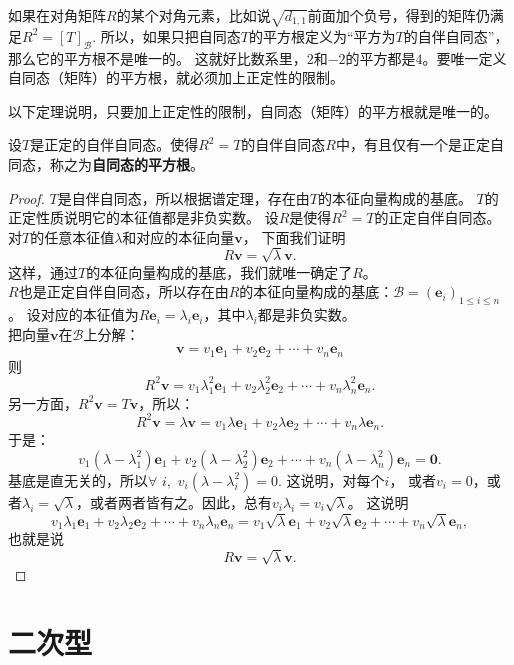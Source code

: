 \documentclass[12pt,UTF8]{ctexbook}
\begin{document}
如果在对角矩阵$R$的某个对角元素，比如说$\sqrt{d_{1,1}}$前面加个负号，得到的矩阵仍满足$R^2 = [T]_\mathcal{B}$. 
所以，如果只把自同态$T$的平方根定义为“平方为$T$的自伴自同态”，那么它的平方根不是唯一的。
这就好比数系里，$2$和$-2$的平方都是$4$。要唯一定义自同态（矩阵）的平方根，就必须加上正定性的限制。

以下定理说明，只要加上正定性的限制，自同态（矩阵）的平方根就是唯一的。
\begin{pp}\label{pp:8_13}
    设$T$是正定的自伴自同态。使得$R^2 = T$的自伴自同态$R$中，有且仅有一个是正定自同态，称之为\textbf{自同态的平方根}。
\end{pp}
\begin{proof} %
    $T$是自伴自同态，所以根据谱定理，存在由$T$的本征向量构成的基底。
    $T$的正定性质说明它的本征值都是非负实数。
    设$R$是使得$R^2 = T$的正定自伴自同态。对$T$的任意本征值$\lambda$和对应的本征向量$\mathbf{v}$，
    下面我们证明
    $$R\mathbf{v} = \sqrt{\lambda}\mathbf{v}.$$
    这样，通过$T$的本征向量构成的基底，我们就唯一确定了$R$。\\
    $R$也是正定自伴自同态，所以存在由$R$的本征向量构成的基底：$\mathcal{B} = (\mathbf{e}_i)_{1\leqslant i \leqslant n}$。
    设对应的本征值为$R\mathbf{e}_i = \lambda_i \mathbf{e}_i$，其中$\lambda_i$都是非负实数。\\
    把向量$\mathbf{v}$在$\mathcal{B}$上分解：
    $$ \mathbf{v} = v_1 \mathbf{e}_1 + v_2 \mathbf{e}_2 + \cdots + v_n \mathbf{e}_n $$
    则
    $$ R^2 \mathbf{v} = v_1 \lambda_1^2 \mathbf{e}_1 + v_2 \lambda_2^2 \mathbf{e}_2 + \cdots + v_n \lambda_n^2 \mathbf{e}_n. $$
    另一方面，$R^2 \mathbf{v} = T \mathbf{v}$，所以：
    $$ R^2 \mathbf{v} = \lambda \mathbf{v} = v_1 \lambda \mathbf{e}_1 + v_2 \lambda \mathbf{e}_2 + \cdots + v_n \lambda \mathbf{e}_n.$$
    于是：
    $$ v_1 (\lambda - \lambda_1^2) \mathbf{e}_1 + v_2 (\lambda - \lambda_2^2) \mathbf{e}_2 + \cdots + v_n (\lambda - \lambda_n^2) \mathbf{e}_n = \mathbf{0}.$$
    基底是直无关的，所以$\forall \,\, i ,\,\, v_i (\lambda - \lambda_i^2) = 0$. 这说明，对每个$i$，
    或者$v_i = 0$，或者$\lambda_i = \sqrt{\lambda}$，或者两者皆有之。因此，总有$v_i\lambda_i = v_i\sqrt{\lambda}$。
    这说明
    $$ v_1 \lambda_1 \mathbf{e}_1 + v_2 \lambda_2 \mathbf{e}_2 + \cdots + v_n \lambda_n \mathbf{e}_n = v_1 \sqrt{\lambda} \mathbf{e}_1 + v_2 \sqrt{\lambda} \mathbf{e}_2 + \cdots + v_n \sqrt{\lambda} \mathbf{e}_n, $$
    也就是说
    $$ R \mathbf{v} = \sqrt{\lambda} \mathbf{v}.$$
\end{proof}

\chapter{二次型}
\end{document}
